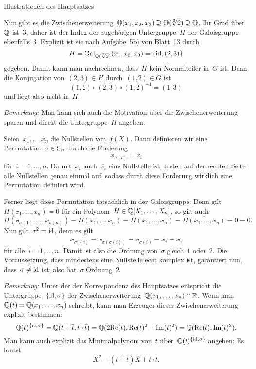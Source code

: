 \documentclass{algblatt}
\begin{document}
\begin{aufgabe}{Illustrationen des Hauptsatzes}
\begin{loesungE}
Nun gibt es die Zwischenerweiterung~$\mathbb{Q}(x_1,x_2,x_3) \supseteq
\mathbb{Q}(\sqrt[3]{2}) \supseteq \mathbb{Q}$. Ihr Grad über~$\mathbb{Q}$ ist~$3$, daher ist der
Index der zugehörigen Untergruppe~$H$ der Galoisgruppe ebenfalls~$3$. Explizit ist
sie nach Aufgabe~5b) von Blatt~13 durch
\[ H = \mathrm{Gal}_{\mathbb{Q}(\sqrt[3]{2})}(x_1,x_2,x_3) = \{ \mathrm{id}, (2, 3) \} \]
gegeben. Damit kann man nachrechnen, dass~$H$ kein Normalteiler
in~$G$ ist: Denn die Konjugation von~$(2,3) \in H$
durch~$(1,2) \in G$ ist
\[ (1,2) \circ (2,3) \circ (1,2)^{-1} =
  (1,3) \]
und liegt also nicht in~$H$.

\emph{Bemerkung:} Man kann sich auch die Motivation über die
Zwischenerweiterung sparen und direkt die Untergruppe~$H$ angeben.

\item Seien~$x_1,\ldots,x_n$ die Nullstellen von~$f(X)$. Dann definieren wir
eine Permutation~$\sigma \in \mathrm{S}_n$ durch die Forderung
\[ x_{\sigma(i)} = \overline{x_i} \]
für~$i = 1,\ldots,n$. Da mit~$x_i$ auch~$\overline{x_i}$ eine Nullstelle ist,
treten auf der rechten Seite alle Nullstellen genau einmal auf, sodass durch
diese Forderung wirklich eine Permutation definiert wird.

Ferner liegt diese Permutation tatsächlich in der Galoisgruppe: Denn
gilt~$H(x_1,\ldots,x_n) = 0$ für ein Polynom~$H \in \mathbb{Q}[X_1,\ldots,X_n]$, so
gilt auch
\[ H(x_{\sigma(1)},\ldots,x_{\sigma(n)}) =
  H(\overline{x_1},\ldots,\overline{x_n}) =
  \overline{H}(\overline{x_1},\ldots,\overline{x_n}) =
  \overline{H(x_1,\ldots,x_n)} =
  \overline{0} = 0. \]
Nun gilt~$\sigma^2 = \mathrm{id}$, denn es gilt
\[ x_{\sigma^2(i)} = x_{\sigma(\sigma(i))} = \overline{x_{\sigma(i)}} =
\overline{\overline{x_i}} = x_i \]
für alle~$i = 1,\ldots,n$. Damit ist also die Ordnung von~$\sigma$ gleich~$1$
oder~$2$. Die Voraussetzung, dass mindestens eine Nullstelle echt komplex ist,
garantiert nun, dass~$\sigma \neq \mathrm{id}$ ist; also hat~$\sigma$ Ordnung~$2$.

\emph{Bemerkung:} Unter der der Korrespondenz des Hauptsatzes entspricht die
Untergruppe~$\{\mathrm{id},\sigma\}$ der Zwischenerweiterung~$\mathbb{Q}(x_1,\ldots,x_n) \cap
\mathbb{R}$. Wenn man~$\mathbb{Q}(t) = \mathbb{Q}(x_1,\ldots,x_n)$ schreibt, kann man Erzeuger
dieser Zwischenerweiterung explizit bestimmen:
\[ \mathbb{Q}(t)^{\{\mathrm{id},\sigma\}} = \mathbb{Q}(t + \overline{t}, t \cdot \overline{t}) =
  \mathbb{Q}(2 \mathrm{Re}(t), \mathrm{Re}(t)^2 + \mathrm{Im}(t)^2) =
  \mathbb{Q}(\mathrm{Re}(t), \mathrm{Im}(t)^2). \]
Man kann auch explizit das Minimalpolynom von~$t$
über~$\mathbb{Q}(t)^{\{\mathrm{id},\sigma\}}$ angeben: Es lautet
\[ X^2 - (t + \overline{t}) X + t \cdot \overline{t}. \]


\end{loesungE}
\end{aufgabe}
\end{document}
